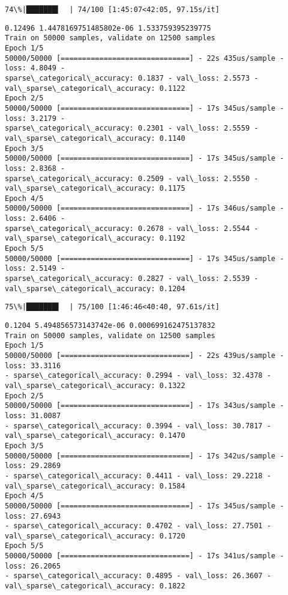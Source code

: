 \documentclass[11pt]{article}
\begin{document}
    \begin{Verbatim}[commandchars=\\\{\}]
 74\%|███████▍  | 74/100 [1:45:07<42:05, 97.15s/it]
    \end{Verbatim}

    \begin{Verbatim}[commandchars=\\\{\}]
0.12496 1.4478169751485802e-06 1.533759395239775
Train on 50000 samples, validate on 12500 samples
Epoch 1/5
50000/50000 [==============================] - 22s 435us/sample - loss: 4.8049 -
sparse\_categorical\_accuracy: 0.1837 - val\_loss: 2.5573 -
val\_sparse\_categorical\_accuracy: 0.1122
Epoch 2/5
50000/50000 [==============================] - 17s 345us/sample - loss: 3.2179 -
sparse\_categorical\_accuracy: 0.2301 - val\_loss: 2.5559 -
val\_sparse\_categorical\_accuracy: 0.1140
Epoch 3/5
50000/50000 [==============================] - 17s 345us/sample - loss: 2.8368 -
sparse\_categorical\_accuracy: 0.2509 - val\_loss: 2.5550 -
val\_sparse\_categorical\_accuracy: 0.1175
Epoch 4/5
50000/50000 [==============================] - 17s 346us/sample - loss: 2.6406 -
sparse\_categorical\_accuracy: 0.2678 - val\_loss: 2.5544 -
val\_sparse\_categorical\_accuracy: 0.1192
Epoch 5/5
50000/50000 [==============================] - 17s 345us/sample - loss: 2.5149 -
sparse\_categorical\_accuracy: 0.2827 - val\_loss: 2.5539 -
val\_sparse\_categorical\_accuracy: 0.1204
    \end{Verbatim}

    \begin{Verbatim}[commandchars=\\\{\}]
 75\%|███████▌  | 75/100 [1:46:46<40:40, 97.61s/it]
    \end{Verbatim}

    \begin{Verbatim}[commandchars=\\\{\}]
0.1204 5.494856573143742e-06 0.000699162475137832
Train on 50000 samples, validate on 12500 samples
Epoch 1/5
50000/50000 [==============================] - 22s 439us/sample - loss: 33.3116
- sparse\_categorical\_accuracy: 0.2994 - val\_loss: 32.4378 -
val\_sparse\_categorical\_accuracy: 0.1322
Epoch 2/5
50000/50000 [==============================] - 17s 343us/sample - loss: 31.0087
- sparse\_categorical\_accuracy: 0.3994 - val\_loss: 30.7817 -
val\_sparse\_categorical\_accuracy: 0.1470
Epoch 3/5
50000/50000 [==============================] - 17s 342us/sample - loss: 29.2869
- sparse\_categorical\_accuracy: 0.4411 - val\_loss: 29.2218 -
val\_sparse\_categorical\_accuracy: 0.1584
Epoch 4/5
50000/50000 [==============================] - 17s 345us/sample - loss: 27.6943
- sparse\_categorical\_accuracy: 0.4702 - val\_loss: 27.7501 -
val\_sparse\_categorical\_accuracy: 0.1720
Epoch 5/5
50000/50000 [==============================] - 17s 341us/sample - loss: 26.2065
- sparse\_categorical\_accuracy: 0.4895 - val\_loss: 26.3607 -
val\_sparse\_categorical\_accuracy: 0.1822
    \end{Verbatim}
\end{document}
